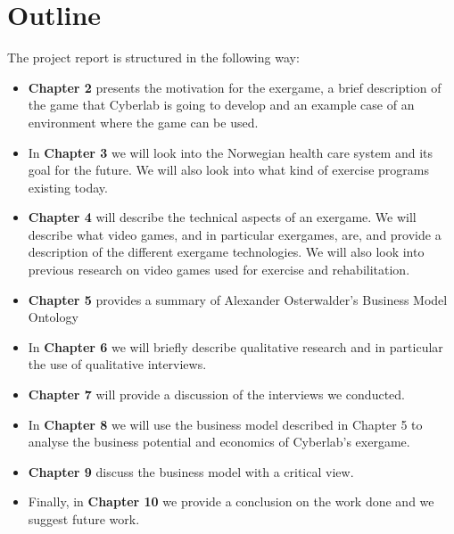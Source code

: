 \section{Outline}
The project report is structured in the following way:
\begin{itemize}
\renewcommand{\labelitemi}{$\bullet$}
\item \textbf{Chapter 2} presents the motivation for the exergame, a brief description of the game that Cyberlab is going to develop and an example case of an environment where the game can be used.
\item In \textbf{Chapter 3} we will look into the Norwegian health care system and its goal for the future. We will also look into what kind of exercise programs existing today.
\item	\textbf{Chapter 4} will describe the technical aspects of an exergame. We will describe what video games, and in particular exergames, are, and provide a description of the different exergame technologies. We will also look into previous research on video games used for exercise and rehabilitation.
\item	\textbf{Chapter 5} provides a summary of Alexander Osterwalder's Business Model Ontology
\item	In \textbf{Chapter 6} we will briefly describe qualitative research and in particular the use of qualitative interviews. 
\item	\textbf{Chapter 7} will provide a discussion of the interviews we conducted.
\item In \textbf{Chapter 8} we will use the business model described in Chapter 5 to analyse the business potential and economics of Cyberlab's exergame.
\item  \textbf{Chapter 9} discuss the business model with a critical view.
\item Finally, in \textbf{Chapter 10} we provide a conclusion on the work done and we suggest future work.
\end{itemize}